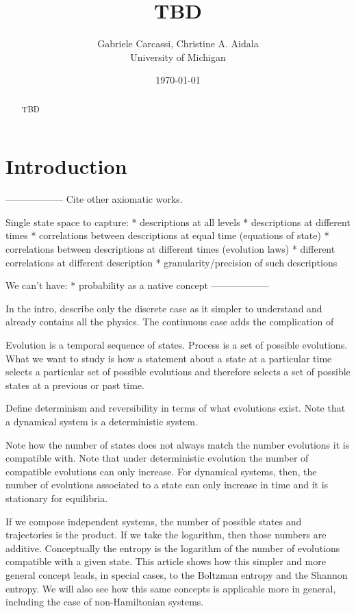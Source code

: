 \documentclass[letterpaper]{article}
\begin{document}
\title{TBD}
\author{Gabriele Carcassi, Christine A. Aidala \\ University of Michigan}

\date{\today}

\maketitle

\begin{abstract}
	TBD
\end{abstract}


\section{Introduction}

------------------
Cite other axiomatic works.

Single state space to capture:
* descriptions at all levels
* descriptions at different times
* correlations between descriptions at equal time (equations of state)
* correlations between descriptions at different times (evolution laws)
* different correlations at different description
* granularity/precision of such descriptions

We can't have:
* probability as a native concept
------------------

In the intro, describe only the discrete case as it simpler to understand and already contains all the physics. The continuous case adds the complication of 

Evolution is a temporal sequence of states. Process is a set of possible evolutions. What we want to study is how a statement about a state at a particular time selects a particular set of possible evolutions and therefore selects a set of possible states at a previous or past time.

Define determinism and reversibility in terms of what evolutions exist. Note that a dynamical system is a deterministic system.

Note how the number of states does not always match the number evolutions it is compatible with. Note that under deterministic evolution the number of compatible evolutions can only increase. For dynamical systems, then, the number of evolutions associated to a state can only increase in time and it is stationary for equilibria.

If we compose independent systems, the number of possible states and trajectories is the product. If we take the logarithm, then those numbers are additive. Conceptually the entropy is the logarithm of the number of evolutions compatible with a given state. This article shows how this simpler and more general concept leads, in special cases, to the Boltzman entropy and the Shannon entropy. We will also see how this same concepts is applicable more in general, including the case of non-Hamiltonian systems.
\end{document}
